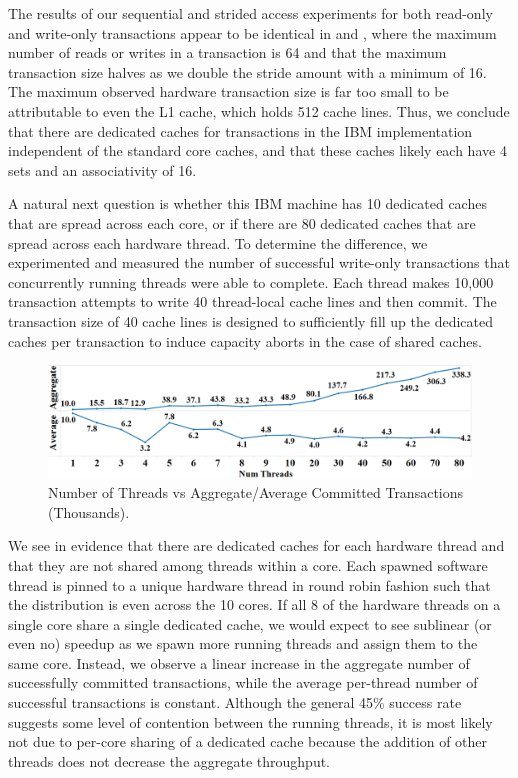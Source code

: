 The results of our sequential and strided access experiments for 
both read-only and write-only
transactions appear to be identical in  and
, where
the maximum number of reads or writes in a transaction
is 64 and that the maximum transaction size 
halves as we double the stride amount with a minimum
of 16.  The maximum observed hardware transaction size is far too
small to be attributable to even the {L1} cache, which holds 512 cache
lines.   Thus, we conclude that there are dedicated caches 
for transactions in the IBM implementation independent
of the standard core caches, and that
these caches likely each have 4 sets and an associativity of 16.

A natural next question is whether this IBM machine 
has 10 dedicated caches that
are spread across each core, or if there are 80 
dedicated caches that are spread
across each hardware thread. To determine the 
difference, we experimented and
measured the number of successful write-only 
transactions that concurrently
running threads were able to complete. Each 
thread makes 10,000 transaction
attempts to write 40 thread-local cache 
lines and then commit. The
transaction size of 40 cache lines is designed 
to sufficiently fill up the
dedicated caches per transaction to induce capacity 
aborts in the case of shared
caches.

\begin{figure}[H]%
\centering
\includegraphics[width=\linewidth]{images/wttm_core_or_thread_ibm}
\vspace{-25pt}
\caption{Number of Threads vs Aggregate/Average Committed Transactions
(Thousands).}
\label{fig:wttm_core_or_thread_ibm}
\end{figure}

We see in  
evidence that there are dedicated caches for each hardware 
thread and that they are not shared among
threads within a core. Each spawned
software thread is pinned to a unique hardware thread 
in round robin fashion
such that the distribution is even across the 10 cores. 
If all 8 of the
hardware threads on a single core share a single 
dedicated cache, we would
expect to see sublinear (or even no) speedup as we spawn
more running threads and assign them to the same core. 
Instead, we observe a
linear increase in the aggregate number of successfully 
committed transactions,
while the average per-thread number of successful 
transactions is constant.
Although the general 45\% success rate suggests some 
level of contention between
the running threads, it is most likely not due to 
per-core sharing of a
dedicated cache because the addition of other threads does
not decrease the aggregate throughput.
 



